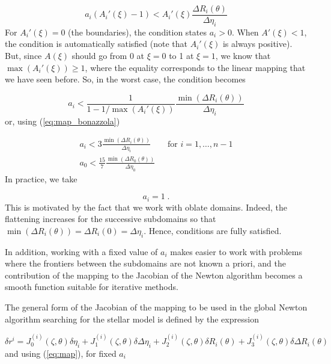 \begin{equation}
a_i(A_i'(\xi)-1)<A_i'(\xi)\frac{\Delta R_i(\theta)}{\Delta\eta_i}
\end{equation}
For $A_i'(\xi)=0$ (the boundaries), the condition states $a_i>0$.
When $A'(\xi)<1$, the condition is automatically satisfied (note that
$A_i'(\xi)$ is always positive).  But, since $A(\xi)$ should go from 0 at
$\xi=0$ to 1 at $\xi=1$, we know that $\max(A_i'(\xi))\ge1$, where the
equality corresponds to the linear mapping that we have seen before. So,
in the worst case, the condition becomes

\begin{equation}
a_i<\frac{1}{1-1/\max(A_i'(\xi))}\frac{\min(\Delta R_i(\theta))}{\Delta\eta_i}
\end{equation}
or, using (\ref{eq:map_bonazzola})

\begin{equation}
\begin{array}{l}
\displaystyle a_i<3\frac{\min(\Delta R_i(\theta))}{\Delta\eta_i} \qquad \mbox{for $i=1,\ldots,n-1$}\\
\displaystyle a_0<\frac{15}{7}\frac{\min(\Delta R_0(\theta))}{\Delta\eta_0}
\end{array}
\label{cdtstab}
\end{equation}
In practice, we take

\begin{equation}
a_i=1\; .
\end{equation}
This is motivated by the fact that
we work with oblate domains. Indeed, the flattening increases for
the successive subdomains so that $\min(\Delta R_i(\theta))=\Delta
R_i(0)=\Delta\eta_i$. Hence, conditions  are fully satisfied.

In addition, working with a fixed value of $a_i$ makes easier to work
with problems where the frontiers between the subdomains are not known
a priori, and the contribution of the mapping to the Jacobian of the
Newton algorithm becomes a smooth function
suitable for iterative methods.

The general form of the Jacobian of the mapping to be used in the
global Newton algorithm searching for the stellar model is defined by
the expression

\begin{equation}
\delta r^{i}=J_0^{(i)}(\zeta,\theta)\delta\eta_i+
             J_1^{(i)}(\zeta,\theta)\delta\Delta\eta_i
            +J_2^{(i)}(\zeta,\theta)\delta R_i(\theta)
            +J_3^{(i)}(\zeta,\theta)\delta\Delta R_i(\theta)
\end{equation}
and using (\ref{eq:map}), for fixed $a_i$

